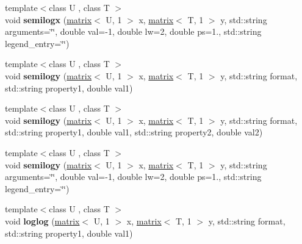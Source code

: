 \begin{DoxyCompactItemize}
\item 
\hypertarget{classkeycpp_1_1_figure_a475b3fd86dceb24c4b54ba37d3322e2c}{{\footnotesize template$<$class U , class T $>$ }\\void {\bfseries semilogx} (\hyperlink{classkeycpp_1_1matrix}{matrix}$<$ U, 1 $>$ x, \hyperlink{classkeycpp_1_1matrix}{matrix}$<$ T, 1 $>$ y, std\-::string arguments=\char`\"{}\char`\"{}, double val=-\/1, double lw=2, double ps=1., std\-::string legend\-\_\-entry=\char`\"{}\char`\"{})}\label{classkeycpp_1_1_figure_a475b3fd86dceb24c4b54ba37d3322e2c}

\item 
\hypertarget{classkeycpp_1_1_figure_a56ff722f72d5bcd0647a958f4fa6b126}{{\footnotesize template$<$class U , class T $>$ }\\void {\bfseries semilogy} (\hyperlink{classkeycpp_1_1matrix}{matrix}$<$ U, 1 $>$ x, \hyperlink{classkeycpp_1_1matrix}{matrix}$<$ T, 1 $>$ y, std\-::string format, std\-::string property1, double val1)}\label{classkeycpp_1_1_figure_a56ff722f72d5bcd0647a958f4fa6b126}

\item 
\hypertarget{classkeycpp_1_1_figure_a3bca3cb378226263f7d12ec958a0b04d}{{\footnotesize template$<$class U , class T $>$ }\\void {\bfseries semilogy} (\hyperlink{classkeycpp_1_1matrix}{matrix}$<$ U, 1 $>$ x, \hyperlink{classkeycpp_1_1matrix}{matrix}$<$ T, 1 $>$ y, std\-::string format, std\-::string property1, double val1, std\-::string property2, double val2)}\label{classkeycpp_1_1_figure_a3bca3cb378226263f7d12ec958a0b04d}

\item 
\hypertarget{classkeycpp_1_1_figure_af5423942c7365262ea4d5d49fb677ee4}{{\footnotesize template$<$class U , class T $>$ }\\void {\bfseries semilogy} (\hyperlink{classkeycpp_1_1matrix}{matrix}$<$ U, 1 $>$ x, \hyperlink{classkeycpp_1_1matrix}{matrix}$<$ T, 1 $>$ y, std\-::string arguments=\char`\"{}\char`\"{}, double val=-\/1, double lw=2, double ps=1., std\-::string legend\-\_\-entry=\char`\"{}\char`\"{})}\label{classkeycpp_1_1_figure_af5423942c7365262ea4d5d49fb677ee4}

\item 
\hypertarget{classkeycpp_1_1_figure_af6214a2be48dc42ad4f2888ba3491284}{{\footnotesize template$<$class U , class T $>$ }\\void {\bfseries loglog} (\hyperlink{classkeycpp_1_1matrix}{matrix}$<$ U, 1 $>$ x, \hyperlink{classkeycpp_1_1matrix}{matrix}$<$ T, 1 $>$ y, std\-::string format, std\-::string property1, double val1)}\label{classkeycpp_1_1_figure_af6214a2be48dc42ad4f2888ba3491284}


\end{DoxyCompactItemize}
